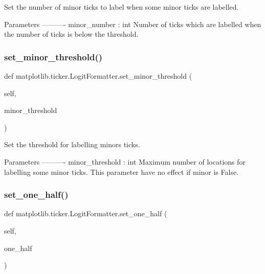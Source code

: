 \begin{DoxyVerb}Set the number of minor ticks to label when some minor ticks are
labelled.

Parameters
----------
minor_number : int
    Number of ticks which are labelled when the number of ticks is
    below the threshold.
\end{DoxyVerb}
 \mbox{\label{classmatplotlib_1_1ticker_1_1LogitFormatter_a715a09ef25cd17dd1f09bb1ee80be3df}} 
\subsubsection{\texorpdfstring{set\+\_\+minor\+\_\+threshold()}{set\_minor\_threshold()}}
{\footnotesize\ttfamily def matplotlib.\+ticker.\+Logit\+Formatter.\+set\+\_\+minor\+\_\+threshold (\begin{DoxyParamCaption}\item[{}]{self,  }\item[{}]{minor\+\_\+threshold }\end{DoxyParamCaption})}

\begin{DoxyVerb}Set the threshold for labelling minors ticks.

Parameters
----------
minor_threshold : int
    Maximum number of locations for labelling some minor ticks. This
    parameter have no effect if minor is False.
\end{DoxyVerb}
 \mbox{\label{classmatplotlib_1_1ticker_1_1LogitFormatter_a65fc194bf13642e9f72098b07ffc2233}} 
\subsubsection{\texorpdfstring{set\+\_\+one\+\_\+half()}{set\_one\_half()}}
{\footnotesize\ttfamily def matplotlib.\+ticker.\+Logit\+Formatter.\+set\+\_\+one\+\_\+half (\begin{DoxyParamCaption}\item[{}]{self,  }\item[{}]{one\+\_\+half }\end{DoxyParamCaption})}

